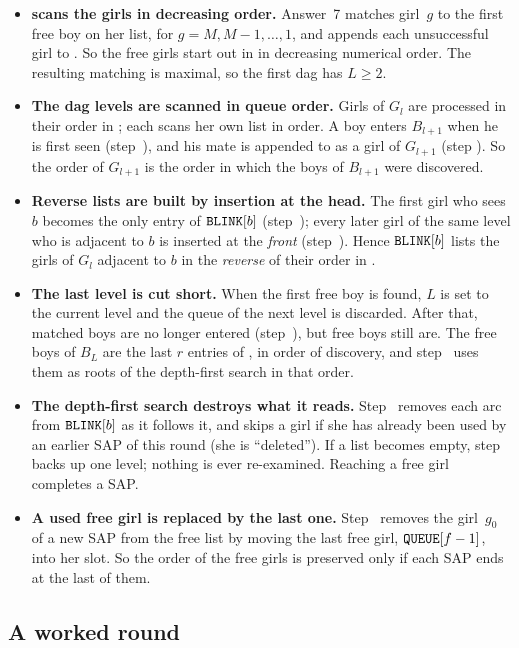 \begin{itemize}
\item \textbf{ scans the girls in decreasing order.} Answer~7 matches
  girl~$g$ to the first free boy on her list, for $g=M,M-1,\ldots,1$,
  and appends each unsuccessful girl to . So the free girls
  start out in  in decreasing numerical order. The resulting
  matching is maximal, so the first dag has $L\ge2$.
\item \textbf{The dag levels are scanned in queue order.} Girls of $G_l$
  are processed in their order in ; each scans her own list in
  order. A boy enters $B_{l+1}$ when he is first seen (step~), and
  his mate is appended to  as a girl of $G_{l+1}$ (step
  ). So the order of $G_{l+1}$ is the order in which the boys of
  $B_{l+1}$ were discovered.
\item \textbf{Reverse lists are built by insertion at the head.} The
  first girl who sees $b$ becomes the only entry of $\texttt{BLINK}[b]$
  (step~); every later girl of the same level who is adjacent to $b$
  is inserted at the \emph{front} (step~). Hence $\texttt{BLINK}[b]$ lists
  the girls of $G_l$ adjacent to $b$ in the \emph{reverse} of their order
  in .
\item \textbf{The last level is cut short.} When the first free boy is
  found, $L$ is set to the current level and the queue of the next
  level is discarded. After that, matched boys are no longer entered
  (step~), but free boys still are. The free boys of $B_L$ are the
  last $r$ entries of , in order of discovery, and step~
  uses them as roots of the depth-first search in that order.
\item \textbf{The depth-first search destroys what it reads.} Step~
  removes each arc from $\texttt{BLINK}[b]$ as it follows it, and skips a
  girl if she has already been used by an earlier SAP of this round
  (she is ``deleted''). If a list becomes empty, step~ backs up
  one level; nothing is ever re-examined. Reaching a free girl completes
  a SAP.
\item \textbf{A used free girl is replaced by the last one.} Step~
  removes the girl~$g_0$ of a new SAP from the free list by moving the
  last free girl, $\texttt{QUEUE}[f-1]$, into her slot. So the order of the
  free girls is preserved only if each SAP ends at the last of them.
\end{itemize}

\subsection{A worked round}
\label{sec:worked}

